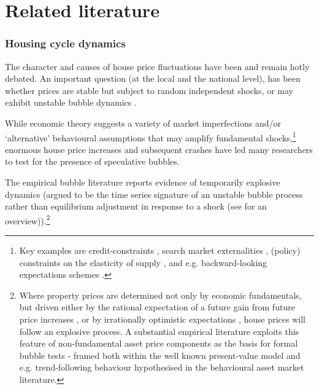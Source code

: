 \documentclass[11pt]{article}
\begin{document}

\section{Related literature} \label{Literature}


\subsubsection{Housing cycle dynamics}


The character and causes of house price fluctuations have been and remain hotly debated. An important question %
(at the local and the national level), has been whether prices are stable but subject to random independent shocks, or may exhibit unstable bubble dynamics \citep{Abraham1994,Clark2011,Mikhed2009,Shiller1990}.

While economic theory suggests a variety of market imperfections and/or ‘alternative’  behavioural assumptions that may amplify fundamental shocks,\footnote{Key examples are credit-constraints \citep{Ortalo-magne2006,Stein1995},  search market externalities \citep{Diaz2013,Wheaton1990}, (policy) constraints on the elasticity of supply \citep{Glaeser2007}, and e.g. backward-looking expectations schemes \citep{Capozza2002,Case1988}.} enormous house price increases and subsequent crashes have led many researchers to test for the presence of speculative bubbles.

The empirical bubble literature reports evidence of temporarily explosive dynamics (argued to be the time series signature of an unstable bubble process rather than equilibrium adjustment in response to a shock  (see \cite{Phillips2015} for an overview)).\footnote{Where property prices are determined not only by economic fundamentals, but driven either by the rational expectation of a future gain from future price increases \citep{Flood1990},  or by irrationally optimistic expectations \citep{Shiller2000,Vissing-jorgensen2004}, house prices will follow an explosive process. A substantial empirical literature exploits this feature of non-fundamental asset price components as the basis for formal bubble tests - framed both within the well known present-value model \citep{Diba1988,Hall1999,Homm2012,Pavlidis2016,Phillips2011a,Phillips2011} and e.g. trend-following behaviour \citep{Bolt2014} hypothesised in the behavioural asset market literature.} %
\end{document}
